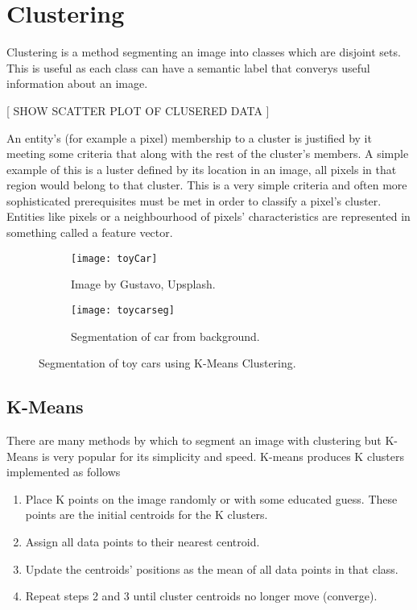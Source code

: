 \section{Clustering}
Clustering is a method segmenting an image into classes which are disjoint sets. This is useful as each class can have a semantic label that converys useful information about an image.

[ SHOW SCATTER PLOT OF CLUSERED DATA  ]

An entity’s  (for example a pixel) membership to a cluster is justified by it meeting some criteria that along with the rest of the cluster’s members. A simple example of this is a luster defined by its location in an image, all pixels in that region would belong to that cluster. This is a very simple criteria and often more sophisticated prerequisites must be met in order to classify a pixel's cluster. Entities like pixels or a neighbourhood of pixels' characteristics are represented in something called a feature vector.


\begin{figure}[H]
	\centering
	\begin{subfigure}[b]{0.5\linewidth}
      		\centering\texttt{[image: toyCar]}
      		\caption{Image by Gustavo, Upsplash.}
		    \label{fig:toycarA}
    	\end{subfigure}%
    	\begin{subfigure}[b]{0.5\linewidth}
      		\centering\texttt{[image: toycarseg]}
      		\caption{Segmentation of car from background.}
       		\label{fig:toycarB}
    	\end{subfigure}
    	\caption{Segmentation of toy cars using K-Means Clustering.}
    	\label{fig:toycar}
\end{figure} 

\subsection{K-Means}
There are many methods by which to segment an image with clustering but K-Means is very popular for its simplicity and speed. K-means produces K clusters implemented as follows

    \begin{enumerate}
    \itemsep0em
        \item Place K points on the image randomly or with some educated guess. These points are the initial centroids for the K clusters.  
        \item Assign all data points to their nearest centroid.
        \item Update the centroids' positions as the mean of all data points in that class.
        \item Repeat steps 2 and 3 until cluster centroids no longer move (converge). 
    \end{enumerate}

